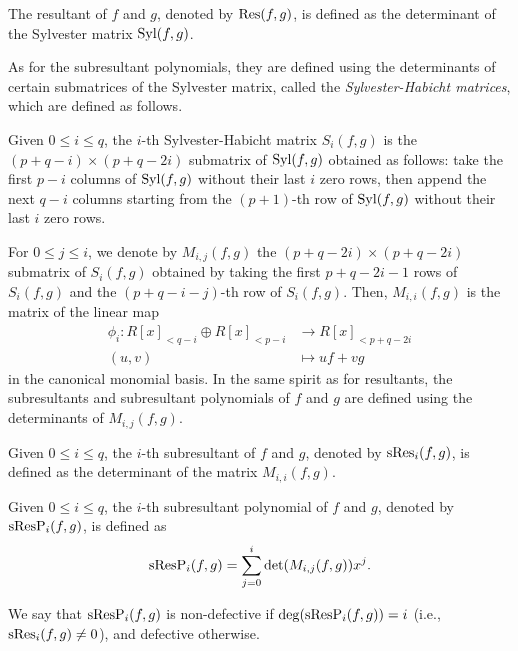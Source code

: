 \begin{definition}[Resultant]
    The resultant of $f$ and $g$, denoted by $\operatorname{Res}(f,g)$, is defined as the determinant of the Sylvester matrix $\operatorname{Syl}(f,g)$.
\end{definition}

As for the subresultant polynomials, they are defined using the determinants of certain submatrices of the Sylvester matrix, called the \emph{Sylvester-Habicht matrices}, which are defined as follows.

\begin{definition}
    Given $0\leq i\leq q$, the $i$-th Sylvester-Habicht matrix $S_i(f,g)$ is the $(p+q-i)\times(p+q-2i)$ submatrix of $\operatorname{Syl}(f,g)$ obtained as follows: take the first $p-i$ columns of $\operatorname{Syl}(f,g)$ without their last $i$ zero rows, then append the next $q-i$ columns starting from the $(p+1)$-th row of $\operatorname{Syl}(f,g)$ without their last $i$ zero rows.
\end{definition}

For $0\leq j\leq i$, we denote by $M_{i,j}(f,g)$ the $(p+q-2i)\times(p+q-2i)$ submatrix of $S_i(f,g)$ obtained by taking the first $p+q-2i-1$ rows of $S_i(f,g)$ and the $(p+q-i-j)$-th row of $S_i(f,g)$. Then, $M_{i,i}(f,g)$ is the matrix of the linear map
\begin{align*}
    \phi_i : R[x]_{<q-i} \oplus R[x]_{<p-i} & \to R[x]_{<p+q-2i} \\
    (u,v)                                   & \mapsto uf + vg
\end{align*}
in the canonical monomial basis. In the same spirit as for resultants, the subresultants and subresultant polynomials of $f$ and $g$ are defined using the determinants of $M_{i,j}(f,g)$.

\begin{definition}[Subresultant]
    Given $0\leq i\leq q$, the $i$-th subresultant of $f$ and $g$, denoted by $\operatorname{sRes}_i(f,g)$, is defined as the determinant of the matrix $M_{i,i}(f,g)$.
\end{definition}

\begin{definition}
    Given $0\leq i\leq q$, the $i$-th subresultant polynomial of $f$ and $g$, denoted by $\operatorname{sResP}_i(f,g)$, is defined as
    \begin{equation*}
        \operatorname{sResP}_i(f,g) = \sum_{j=0}^i \det(M_{i,j}(f,g)) x^j.
    \end{equation*}

    We say that $\operatorname{sResP}_i(f,g)$ is non-defective if $\deg(\operatorname{sResP}_i(f,g))=i$ (i.e., $\operatorname{sRes}_i(f,g)\neq 0$), and defective otherwise.
\end{definition}

